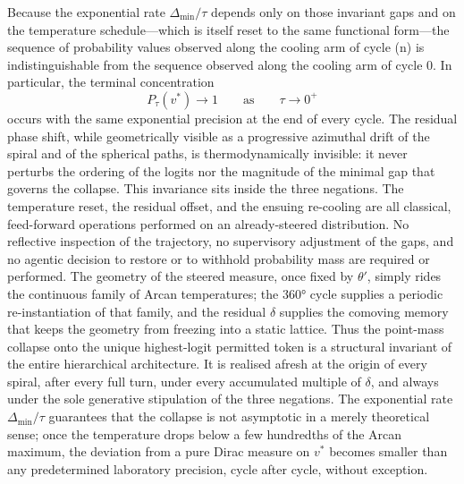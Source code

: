 Because the exponential rate \(\Delta_{\min}/\tau\) depends only on those invariant gaps and on the temperature schedule—which is itself reset to the same functional form—the sequence of probability values observed along the cooling arm of cycle (n) is indistinguishable from the sequence observed along the cooling arm of cycle 0. In particular, the terminal concentration
\[
P_{\tau}(v^*)\to1\qquad\text{as}\qquad\tau\to0^+
\]
occurs with the same exponential precision at the end of every cycle. The residual phase shift, while geometrically visible as a progressive azimuthal drift of the spiral and of the spherical paths, is thermodynamically invisible: it never perturbs the ordering of the logits nor the magnitude of the minimal gap that governs the collapse.
This invariance sits inside the three negations. The temperature reset, the residual offset, and the ensuing re-cooling are all classical, feed-forward operations performed on an already-steered distribution. No reflective inspection of the trajectory, no supervisory adjustment of the gaps, and no agentic decision to restore or to withhold probability mass are required or performed. The geometry of the steered measure, once fixed by \(\theta'\), simply rides the continuous family of Arcan temperatures; the 360° cycle supplies a periodic re-instantiation of that family, and the residual \(\delta\) supplies the comoving memory that keeps the geometry from freezing into a static lattice.
Thus the point-mass collapse onto the unique highest-logit permitted token is a structural invariant of the entire hierarchical architecture. It is realised afresh at the origin of every spiral, after every full turn, under every accumulated multiple of \(\delta\), and always under the sole generative stipulation of the three negations. The exponential rate \(\Delta_{\min}/\tau\) guarantees that the collapse is not asymptotic in a merely theoretical sense; once the temperature drops below a few hundredths of the Arcan maximum, the deviation from a pure Dirac measure on \(v^*\) becomes smaller than any predetermined laboratory precision, cycle after cycle, without exception.

